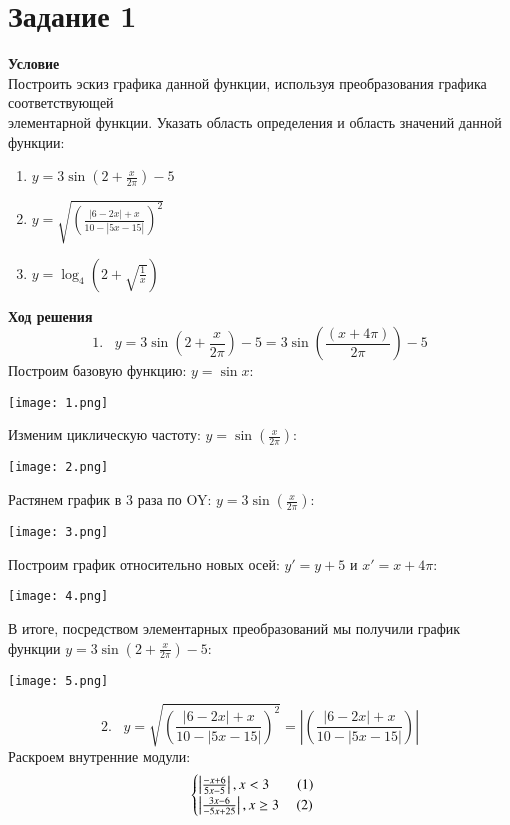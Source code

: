 \newpage
\section{Задание 1}
 {\bf\large Условие} \\Построить эскиз графика данной функции, используя преобразования
графика соответствующей \\ элементарной функции. Указать область определения и область значений данной функции:
\begin{enumerate}
    \item $y =3\sin{\left(2+\frac{x}{2\pi}\right)}-5$
    \item $y =\sqrt{\left(\frac{|6-2x|+x}{10-|5x-15|}\right)^2}$
    \item $y =\log_4{\left(2+\sqrt{\frac{1}{x}}\right)}$
\end{enumerate}
{\bf\large Ход решения} 
\[
    1. \hspace{10pt} y =3\sin{\left(2+\frac{x}{2\pi}\right)}-5 = 3\sin{\left(\frac{(x+4\pi)}{2\pi}\right)}-5
\]
Построим базовую функцию: $y = \sin{x}$: \\
\begin{center}\texttt{[image: 1.png]}\end{center}
Изменим циклическую частоту: $y = \sin{\left(\frac{x}{2\pi}\right)}$: \\
\begin{center}\texttt{[image: 2.png]}\end{center}
Растянем график в 3 раза по OY: $y = 3\sin{\left(\frac{x}{2\pi}\right)}$:
\begin{center}\texttt{[image: 3.png]}\end{center}
Построим график относительно новых осей: 
$y' = y + 5$ и $x' = x + 4\pi$:
\begin{center}\texttt{[image: 4.png]}\end{center}
В итоге, посредством элементарных преобразований мы получили график функции $y =3\sin{\left(2+\frac{x}{2\pi}\right)}-5$:
\begin{center}\texttt{[image: 5.png]}\end{center}
\newpage
\[
    2. \hspace{10pt} y =\sqrt{\left(\frac{|6-2x|+x}{10-|5x-15|}\right)^2} = \left|\left(\frac{|6-2x|+x}{10-|5x-15|}\right)\right|
\]
\noindent Раскроем внутренние модули:
\begin{equation*}
    \begin{cases}
        \left|\frac{-x+6}{5x-5}\right|, x < 3 \hspace{20pt} (1)\\
        \left|\frac{3x-6}{-5x+25}\right|, x \geq 3  \hspace{12.5pt} (2)\\
    \end{cases}
\end{equation*}
